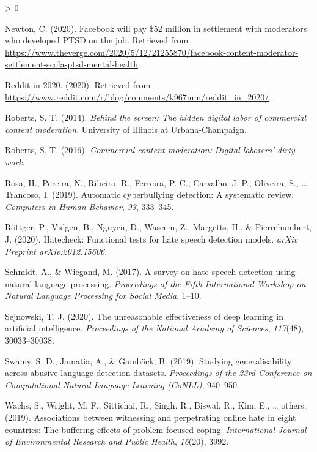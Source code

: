 \documentclass[
  10pt,
  dvipsnames,enabledeprecatedfontcommands]{scrartcl}
\newlength{\cslhangindent}
\newenvironment{CSLReferences}[2] %
 {%
  \setlength{\parindent}{0pt}
  \ifodd #1 \everypar{\setlength{\hangindent}{\cslhangindent}}\ignorespaces\fi
  \ifnum #2 > 0
  \setlength{\parskip}{#2\baselineskip}
  \fi
 }%
 {}
\begin{document}
\begin{CSLReferences}{1}{0}
\leavevmode\hypertarget{ref-newton_facebook_2020}{}%
Newton, C. (2020). Facebook will pay \$52 million in settlement with
moderators who developed {PTSD} on the job. Retrieved from
\url{https://www.theverge.com/2020/5/12/21255870/facebook-content-moderator-settlement-scola-ptsd-mental-health}

\leavevmode\hypertarget{ref-noauthor_reddit_nodate}{}%
Reddit in 2020. (2020). Retrieved from
\url{https://www.reddit.com/r/blog/comments/k967mm/reddit_in_2020/}

\leavevmode\hypertarget{ref-roberts2014behind}{}%
Roberts, S. T. (2014). \emph{Behind the screen: The hidden digital labor
of commercial content moderation}. University of Illinois at
Urbana-Champaign.

\leavevmode\hypertarget{ref-roberts2016commercial}{}%
Roberts, S. T. (2016). \emph{Commercial content moderation: Digital
laborers' dirty work}.

\leavevmode\hypertarget{ref-rosa2019automatic}{}%
Rosa, H., Pereira, N., Ribeiro, R., Ferreira, P. C., Carvalho, J. P.,
Oliveira, S., \ldots{} Trancoso, I. (2019). Automatic cyberbullying
detection: A systematic review. \emph{Computers in Human Behavior},
\emph{93}, 333--345.

\leavevmode\hypertarget{ref-rottger2020hatecheck}{}%
Röttger, P., Vidgen, B., Nguyen, D., Waseem, Z., Margetts, H., \&
Pierrehumbert, J. (2020). Hatecheck: Functional tests for hate speech
detection models. \emph{arXiv Preprint arXiv:2012.15606}.

\leavevmode\hypertarget{ref-schmidt2017survey}{}%
Schmidt, A., \& Wiegand, M. (2017). A survey on hate speech detection
using natural language processing. \emph{Proceedings of the Fifth
International Workshop on Natural Language Processing for Social Media},
1--10.

\leavevmode\hypertarget{ref-sejnowski2020unreasonable}{}%
Sejnowski, T. J. (2020). The unreasonable effectiveness of deep learning
in artificial intelligence. \emph{Proceedings of the National Academy of
Sciences}, \emph{117}(48), 30033--30038.

\leavevmode\hypertarget{ref-swamy2019studying}{}%
Swamy, S. D., Jamatia, A., \& Gambäck, B. (2019). Studying
generalisability across abusive language detection datasets.
\emph{Proceedings of the 23rd Conference on Computational Natural
Language Learning (CoNLL)}, 940--950.

\leavevmode\hypertarget{ref-wachs2019associations}{}%
Wachs, S., Wright, M. F., Sittichai, R., Singh, R., Biswal, R., Kim, E.,
\ldots{} others. (2019). Associations between witnessing and
perpetrating online hate in eight countries: The buffering effects of
problem-focused coping. \emph{International Journal of Environmental
Research and Public Health}, \emph{16}(20), 3992.


\end{CSLReferences}
\end{document}
